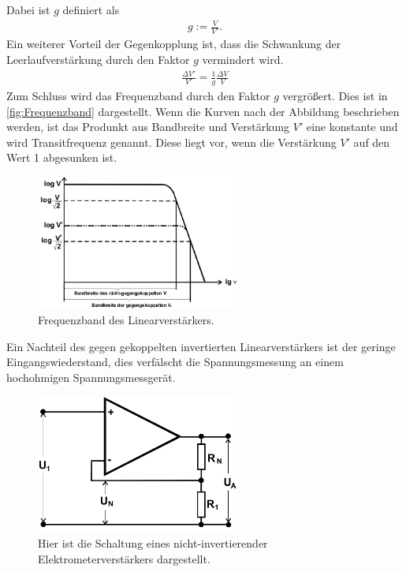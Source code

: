 Dabei ist $g$ definiert als
\begin{align}
	g:= \frac{V}{V'}.
\end{align}
Ein weiterer Vorteil der Gegenkopplung ist, dass die Schwankung der Leerlaufverstärkung durch den Faktor $g$ vermindert wird.
\begin{align}
	\frac{\Delta V'}{V'}=\frac{1}{g}\frac{\Delta V}{V}
\end{align}
Zum Schluss wird das Frequenzband durch den Faktor $g$ vergrößert.
Dies ist in \cref{fig:Frequenzband} dargestellt. Wenn die Kurven nach der Abbildung beschrieben werden, ist das Produnkt aus Bandbreite und Verstärkung $V'$ eine  konstante und wird Transitfrequenz genannt.
Diese liegt vor, wenn die Verstärkung $V'$ auf den Wert 1 abgesunken ist.
\begin{figure}
	\centering
	\includegraphics[width = 0.6\textwidth]{../Grafiken/Frequenz_Liniearverstaerker.png}
	\caption{Frequenzband des Linearverstärkers. \cite{V51}\label{fig:Frequenzgang}}
\end{figure}
Ein Nachteil des gegen gekoppelten invertierten Linearverstärkers ist der geringe Eingangswiederstand, dies verfälscht die Spannungsmessung an einem hochohmigen Spannungsmessgerät.
\begin{figure}[h!]
	\centering
	\includegraphics[width = 0.6\textwidth]{../Grafiken/nicht_invertierter_Linearverstaerker.png}
	\caption{Hier ist die Schaltung eines nicht-invertierender Elektrometerverstärkers dargestellt. \cite{V51}\label{fig:Elektrometerverstärker}}
\end{figure}
